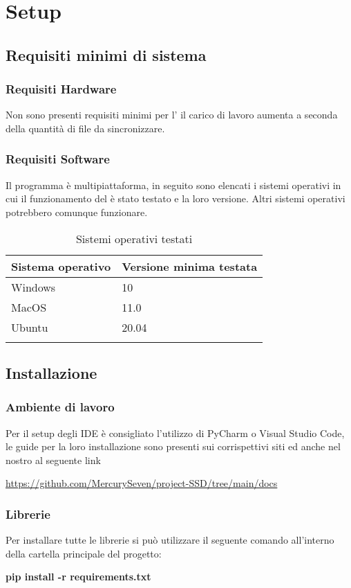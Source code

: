 \section{Setup}
\subsection{Requisiti minimi di sistema}
\subsubsection{Requisiti Hardware}
Non sono presenti requisiti minimi per l' il carico di lavoro aumenta a seconda della quantità di file da sincronizzare.
\subsubsection{Requisiti Software}
Il programma è multipiattaforma, in seguito sono elencati i sistemi operativi in cui il funzionamento del  è stato testato e la loro versione. Altri sistemi operativi potrebbero comunque funzionare.

{
	\setlength{\freewidth}{\dimexpr\textwidth-1\tabcolsep}
	\renewcommand{\arraystretch}{1.5}
	\setlength{\aboverulesep}{0pt}
	\setlength{\belowrulesep}{0pt}
	\begin{longtable}{L{.210\freewidth} C{.68\freewidth}}
		\textbf{Sistema operativo} & \textbf{Versione minima testata} \\
		\toprule
		\endhead		
		Windows & 10 \\ 
		MacOS & 11.0 \\ 
		Ubuntu & 20.04 \\	
				
		\bottomrule
		\hiderowcolors
		\caption{Sistemi operativi testati}
	\end{longtable}
}
\subsection{Installazione}

\subsubsection{Ambiente di lavoro}

Per il setup degli IDE è consigliato l'utilizzo di PyCharm o Visual Studio Code, le guide per la loro installazione sono presenti sui corrispettivi siti ed anche nel nostro  al seguente link

\centerline{\url{https://github.com/MercurySeven/project-SSD/tree/main/docs}}
\subsubsection{Librerie}
\label{sec:Librerie}
Per installare tutte le librerie si può utilizzare il seguente comando all'interno della cartella principale del progetto:\newline{}
\centerline{\textbf{pip install -r requirements.txt}}
	



